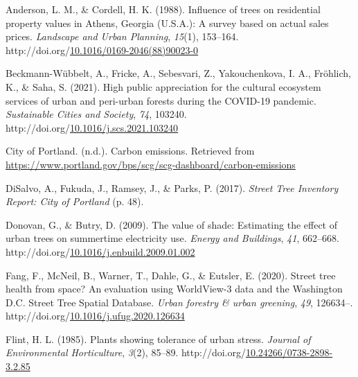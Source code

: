 \documentclass[12pt,twoside]{reedthesis}
\newlength{\cslhangindent}
\newenvironment{CSLReferences}[2] %
 {%
  \setlength{\parindent}{0pt}
  \ifodd #1 \everypar{\setlength{\hangindent}{\cslhangindent}}\ignorespaces\fi
  \ifnum #2 > 0
  \setlength{\parskip}{#2\baselineskip}
  \fi
 }%
 {}
\begin{document}

\noindent

\setlength{\parindent}{-0.20in}

\hypertarget{refs}{}
\begin{CSLReferences}{1}{0}
\leavevmode{}%
Anderson, L. M., \& Cordell, H. K. (1988). Influence of trees on residential property values in Athens, Georgia (U.S.A.): A survey based on actual sales prices. \emph{Landscape and Urban Planning}, \emph{15}(1), 153--164. http://doi.org/\href{https://doi.org/10.1016/0169-2046(88)90023-0}{10.1016/0169-2046(88)90023-0}

\leavevmode{}%
Beckmann-Wübbelt, A., Fricke, A., Sebesvari, Z., Yakouchenkova, I. A., Fröhlich, K., \& Saha, S. (2021). High public appreciation for the cultural ecosystem services of urban and peri{\nobreakdash-}urban forests during the COVID-19 pandemic. \emph{Sustainable Cities and Society}, \emph{74}, 103240. http://doi.org/\href{https://doi.org/10.1016/j.scs.2021.103240}{10.1016/j.scs.2021.103240}

\leavevmode{}%
City of Portland. (n.d.). Carbon emissions. Retrieved from \url{https://www.portland.gov/bps/scg/scg-dashboard/carbon-emissions}

\leavevmode{}%
DiSalvo, A., Fukuda, J., Ramsey, J., \& Parks, P. (2017). \emph{Street Tree Inventory Report: City of Portland} (p. 48).

\leavevmode{}%
Donovan, G., \& Butry, D. (2009). The value of shade: Estimating the effect of urban trees on summertime electricity use. \emph{Energy and Buildings}, \emph{41}, 662--668. http://doi.org/\href{https://doi.org/10.1016/j.enbuild.2009.01.002}{10.1016/j.enbuild.2009.01.002}

\leavevmode{}%
Fang, F., McNeil, B., Warner, T., Dahle, G., \& Eutsler, E. (2020). Street tree health from space? An evaluation using WorldView-3 data and the Washington D.C. Street Tree Spatial Database. \emph{Urban forestry \& urban greening}, \emph{49}, 126634--. http://doi.org/\href{https://doi.org/10.1016/j.ufug.2020.126634}{10.1016/j.ufug.2020.126634}

\leavevmode{}%
Flint, H. L. (1985). Plants showing tolerance of urban stress. \emph{Journal of Environmental Horticulture}, \emph{3}(2), 85--89. http://doi.org/\href{https://doi.org/10.24266/0738-2898-3.2.85}{10.24266/0738-2898-3.2.85}


\end{CSLReferences}
\end{document}
